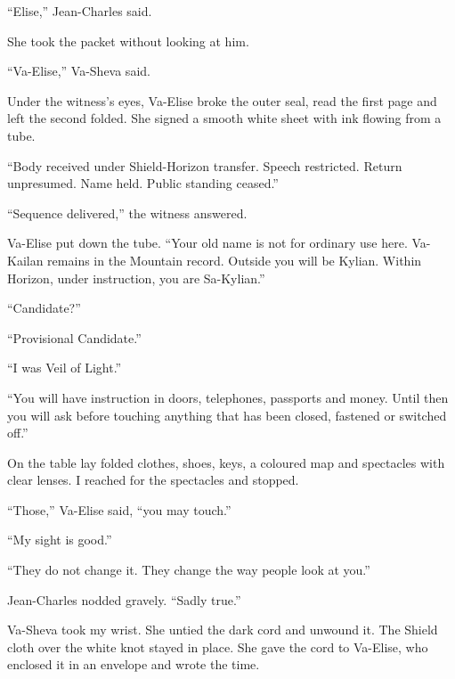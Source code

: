 ``Elise,'' Jean-Charles said.\par

She took the packet without looking at him.\par

``Va-Elise,'' Va-Sheva said.\par

Under the witness's eyes, Va-Elise broke the outer seal, read the first page and left the second folded. She signed a smooth white sheet with ink flowing from a tube.\par

``Body received under Shield-Horizon transfer. Speech restricted. Return unpresumed. Name held. Public standing ceased.''\par

``Sequence delivered,'' the witness answered.\par

Va-Elise put down the tube. ``Your old name is not for ordinary use here. Va-Kailan remains in the Mountain record. Outside you will be Kylian. Within Horizon, under instruction, you are Sa-Kylian.''\par

``Candidate?''\par

``Provisional Candidate.''\par

``I was Veil of Light.''\par

``You will have instruction in doors, telephones, passports and money. Until then you will ask before touching anything that has been closed, fastened or switched off.''\par

On the table lay folded clothes, shoes, keys, a coloured map and spectacles with clear lenses. I reached for the spectacles and stopped.\par

``Those,'' Va-Elise said, ``you may touch.''\par

``My sight is good.''\par

``They do not change it. They change the way people look at you.''\par

Jean-Charles nodded gravely. ``Sadly true.''\par

Va-Sheva took my wrist. She untied the dark cord and unwound it. The Shield cloth over the white knot stayed in place. She gave the cord to Va-Elise, who enclosed it in an envelope and wrote the time.\par

